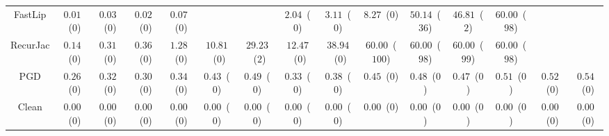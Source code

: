 \begin{table*}
{\begin{tabular}{c|c|c|c|c|c|c|c|c|c|c|c|c|c|c}
      FastLip &  $0.01$~($0$) &  $0.03$~($0$) &  $0.02$~($0$) &  $0.07$~($0$) &               &               &  $2.04$~($0$) &  $3.11$~($0$) &  $8.27$~($0$) & $50.14$~($36$) & $46.81$~($2$) & $60.00$~($98$) &               &               \\
     RecurJac &  $0.14$~($0$) &  $0.31$~($0$) &  $0.36$~($0$) &  $1.28$~($0$) & $10.81$~($0$) & $29.23$~($2$) & $12.47$~($0$) & $38.94$~($0$) & $60.00$~($100$) & $60.00$~($98$) & $60.00$~($99$) & $60.00$~($98$) &               &               \\
\hline
          PGD &  $0.26$~($0$) &  $0.32$~($0$) &  $0.30$~($0$) &  $0.34$~($0$) &  $0.43$~($0$) &  $0.49$~($0$) &  $0.33$~($0$) &  $0.38$~($0$) &  $0.45$~($0$) &  $0.48$~($0$) &  $0.47$~($0$) &  $0.51$~($0$) &  $0.52$~($0$) &  $0.54$~($0$) \\
\hline
        Clean &  $0.00$~($0$) &  $0.00$~($0$) &  $0.00$~($0$) &  $0.00$~($0$) &  $0.00$~($0$) &  $0.00$~($0$) &  $0.00$~($0$) &  $0.00$~($0$) &  $0.00$~($0$) &  $0.00$~($0$) &  $0.00$~($0$) &  $0.00$~($0$) &  $0.00$~($0$) &  $0.00$~($0$) \\

    \bottomrule
    \end{tabular}
    }
    \label{table:exp-A-robust-accuracy-time-mnist-3}
\end{table*}
        

